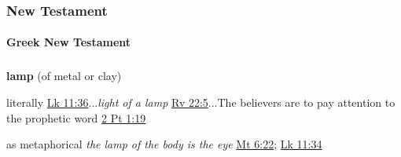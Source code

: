 	\subsubsection{New Testament} %
		\label{LIGHT-NT}
	
			
	
			
			
		\paragraph{Greek New Testament} %
			\label{LIGHT-GREEK}
			
			\subparagraph{\texorpdfstring{}{}}
				\label{LUCHNOS}
			
				\begin{compactdesc}
					\item[BDAG 537b] \textbf{}
						\begin{compactitem}
							\item \textbf{lamp} (of metal or clay)
							\item[a] literally \hyperref[LUKE-11-36]{Lk 11:36}...\textit{light of a lamp} \hyperref[REVELATIONNT-22-5]{Rv 22:5}...The believers are to pay attention to the prophetic word  \hyperref[2PETER-1-19]{2 Pt 1:19}
							\item[b] as metaphorical  \textit{the lamp of the body is the eye} \hyperref[MATTHEW-6-22]{Mt 6:22}; \hyperref[LUKE-11-34]{Lk 11:34}
						\end{compactitem}
				\end{compactdesc}
				
